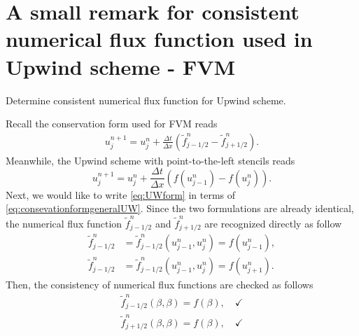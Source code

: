 \documentclass[12pt]{article}
\begin{document}

\section{A small remark for consistent numerical flux function used
  in Upwind scheme - FVM}
\begin{example}
	Determine consistent numerical flux function for Upwind scheme.
\end{example}
Recall the conservation form used for FVM reads
\begin{align}\label{eq:consevationformgeneralUW}
	u_{j}^{n+1} = u_{j}^{n} + \frac{\Delta t}{\Delta x}
	\left(
	\widetilde{f}_{j-1/2}^{n} - \widetilde{f}_{j+1/2}^{n}
	\right).
\end{align}
Meanwhile, the Upwind scheme with point-to-the-left stencils reads
\begin{equation}\label{eq:UWform}
	\boxed{
		u_{j}^{n+1} = 
		u_{j}^{n}
		+\frac{\Delta t}{\Delta x}
		\left(
		f(u_{j-1}^{n}) - f(u_{j}^{n})
		\right).
	}
\end{equation}
Next, we would like to write \eqref{eq:UWform} in terms of \eqref{eq:consevationformgeneralUW}. 
Since the two formulations are already identical, the numerical flux function
$\widetilde{f}_{j-1/2}^{n}$ and $\widetilde{f}_{j+1/2}^{n}$
are recognized directly as follow
\begin{align}
	\widetilde{f}_{j-1/2}^{n}
	 & = \widetilde{f}_{j-1/2}^{n} \left(u_{j-1}^{n}, u_{j}^{n}\right)
	= f(u_{j-1}^{n}),                                                   \label{eq:consistencycheck11} \\
	\widetilde{f}_{j-1/2}^{n}
	 & = \widetilde{f}_{j-1/2}^{n} \left(u_{j-1}^{n}, u_{j}^{n}\right)
	= f(u_{j+1}^{n}).  \label{eq:consistencycheck12}
\end{align}
Then, the consistency of numerical flux functions
are checked as follows
\begin{align}
	\widetilde{f}_{j-1/2}^{n} \left( \beta, \beta\right) = f(\beta), \quad \checkmark \\
	\widetilde{f}_{j+1/2}^{n} \left( \beta, \beta\right) = f(\beta), \quad \checkmark 
\end{align}
\end{document}
